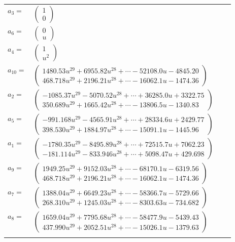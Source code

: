 \documentclass[1p]{elsarticle_modified}
\theoremstyle{definition}
\begin{document}
\begin{tabular}{m{7pt} m{180pt} m{7pt} m{180pt} }
\flushright $a_{3}=$&$\begin{pmatrix}1\\0\end{pmatrix}$ \\
\flushright $a_{6}=$&$\begin{pmatrix}0\\u\end{pmatrix}$ \\
\flushright $a_{4}=$&$\begin{pmatrix}1\\u^2\end{pmatrix}$ \\
\flushright $a_{10}=$&$\begin{pmatrix}1480.53 u^{29}+6955.82 u^{28}+\cdots-52108.0 u-4845.20\\468.718 u^{29}+2196.21 u^{28}+\cdots-16062.1 u-1474.36\end{pmatrix}$ \\
\flushright $a_{2}=$&$\begin{pmatrix}-1085.37 u^{29}-5070.52 u^{28}+\cdots+36285.0 u+3322.75\\350.689 u^{29}+1665.42 u^{28}+\cdots-13806.5 u-1340.83\end{pmatrix}$ \\
\flushright $a_{5}=$&$\begin{pmatrix}-991.168 u^{29}-4565.91 u^{28}+\cdots+28334.6 u+2429.77\\398.530 u^{29}+1884.97 u^{28}+\cdots-15091.1 u-1445.96\end{pmatrix}$ \\
\flushright $a_{1}=$&$\begin{pmatrix}-1780.35 u^{29}-8495.89 u^{28}+\cdots+72515.7 u+7062.23\\-181.114 u^{29}-833.946 u^{28}+\cdots+5098.47 u+429.698\end{pmatrix}$ \\
\flushright $a_{9}=$&$\begin{pmatrix}1949.25 u^{29}+9152.03 u^{28}+\cdots-68170.1 u-6319.56\\468.718 u^{29}+2196.21 u^{28}+\cdots-16062.1 u-1474.36\end{pmatrix}$ \\
\flushright $a_{7}=$&$\begin{pmatrix}1388.04 u^{29}+6649.23 u^{28}+\cdots-58366.7 u-5729.66\\268.310 u^{29}+1245.03 u^{28}+\cdots-8303.63 u-734.682\end{pmatrix}$ \\
\flushright $a_{8}=$&$\begin{pmatrix}1659.04 u^{29}+7795.68 u^{28}+\cdots-58477.9 u-5439.43\\437.990 u^{29}+2052.51 u^{28}+\cdots-15026.1 u-1379.63\end{pmatrix}$\\&\end{tabular}
\end{document}
